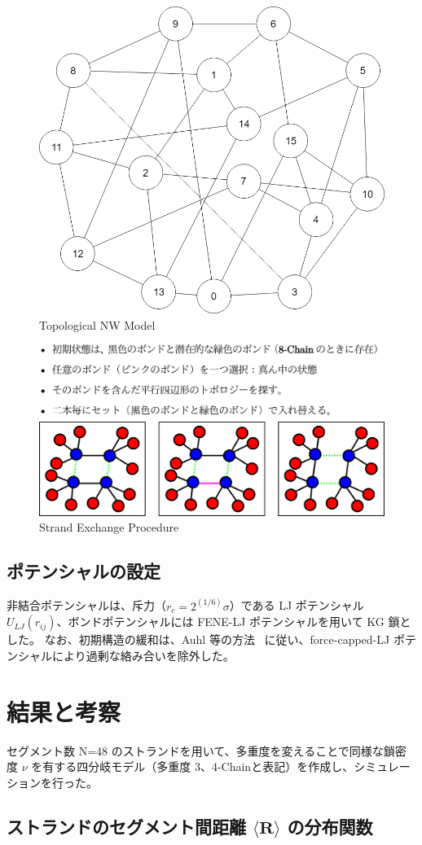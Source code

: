 \documentclass[uplatex,10pt,a4paper,twocolumn]{jsarticle}
\begin{document}
\vspace{-2mm}
\begin{figure}[htb]
	\begin{center}
	\includegraphics[width=.23\textwidth]{Network.png}
	\caption{Topological NW Model}
	\label{fig:topo}
	\end{center}
\end{figure}

\vspace{-8mm}
\begin{figure}[htb]
	\begin{center}
	\includegraphics[width=.42\textwidth]{bond_exchg.png}
	\caption{Strand Exchange Procedure}
	\label{fig:exc}
	\end{center}
\end{figure}
\vspace{-5mm}

\subsection{ポテンシャルの設定}
非結合ポテンシャルは、斥力（$r_c = 2^{(1/6)}\sigma$）である LJ ポテンシャル $U_{LJ}(r_{ij})$、ボンドポテンシャルには FENE-LJ ポテンシャルを用いて KG 鎖とした。
なお、初期構造の緩和は、Auhl 等の方法~\cite{Auhl2003a} に従い、force-capped-LJ ポテンシャルにより過剰な絡み合いを除外した。


    \section{結果と考察}
    セグメント数 N=48 のストランドを用いて、多重度を変えることで同様な鎖密度 $\nu$ を有する四分岐モデル（多重度 3、4-Chainと表記）を作成し、シミュレーションを行った。
    
    \subsection{ストランドのセグメント間距離 $\langle \bm{R} \rangle$ の分布関数}
    
\end{document}
